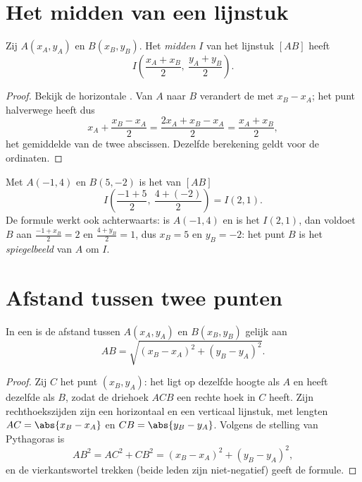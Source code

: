 \section{Het midden van een lijnstuk}

\begin{proposition}\label{prop:g10:coordgeom:midpoint}
Zij $A(x_A, y_A)$ en $B(x_B, y_B)$. Het \emph{midden} $I$ van
het lijnstuk $[AB]$ heeft 
\[
I\left(\frac{x_A + x_B}{2},\ \frac{y_A + y_B}{2}\right).
\]
\end{proposition}

\begin{proof}
Bekijk de horizontale . Van $A$ naar $B$ verandert de  met
$x_B - x_A$; het punt halverwege heeft dus 
\[
x_A + \frac{x_B - x_A}{2} = \frac{2x_A + x_B - x_A}{2}
= \frac{x_A + x_B}{2},
\]
het gemiddelde van de twee abscissen. Dezelfde berekening geldt voor de
ordinaten.
\end{proof}

\begin{example}\label{ex:g10:coordgeom:midpoint}
Met $A(-1, 4)$ en $B(5, -2)$ is het  van $[AB]$
\[
I\left(\frac{-1 + 5}{2},\ \frac{4 + (-2)}{2}\right) = I(2, 1).
\]
De formule werkt ook achterwaarts: is $A(-1, 4)$ en is het  $I(2, 1)$,
dan voldoet $B$ aan $\frac{-1 + x_B}{2} = 2$ en $\frac{4 + y_B}{2} = 1$, dus
$x_B = 5$ en $y_B = -2$: het punt $B$ is het \emph{spiegelbeeld} van $A$ om
$I$.
\end{example}

\section{Afstand tussen twee punten}

\begin{theorem}[Afstandsformule]\label{thm:g10:coordgeom:distance}
In een  is de afstand tussen $A(x_A, y_A)$ en
$B(x_B, y_B)$ gelijk aan
\[
AB = \sqrt{(x_B - x_A)^2 + (y_B - y_A)^2}.
\]
\end{theorem}

\begin{proof}
Zij $C$ het punt $(x_B, y_A)$: het ligt op dezelfde hoogte als $A$ en heeft
dezelfde  als $B$, zodat de driehoek $ACB$ een rechte hoek in $C$
heeft. Zijn rechthoekszijden zijn een horizontaal en een verticaal lijnstuk,
met lengten $AC = \abs{x_B - x_A}$ en $CB = \abs{y_B - y_A}$. Volgens de
stelling van Pythagoras is
\[
AB^2 = AC^2 + CB^2 = (x_B - x_A)^2 + (y_B - y_A)^2,
\]
en de vierkantswortel trekken (beide leden zijn niet-negatief) geeft de
formule.
\end{proof}

